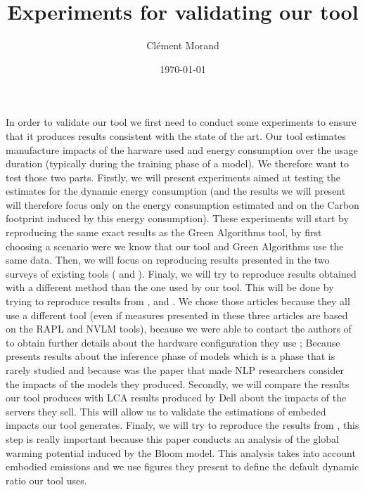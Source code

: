 \documentclass[11pt]{article}
\author{Clément Morand}
\date{\today}
\title{Experiments for validating our tool}
\begin{document}
\maketitle
\tableofcontents

In order to validate our tool we first need to conduct some
experiments to ensure that it produces results consistent with the
state of the art. Our tool estimates manufacture impacts of the
harware used and energy consumption over the usage duration (typically
during the training phase of a model). We therefore want to test those
two parts. 
Firstly, we will present experiments aimed at testing the
estimates for the dynamic energy consumption (and the results we will
present will therefore focus only on the energy consumption estimated
and on the Carbon footprint induced by this energy consumption). These experiments will
start by reproducing the same exact results as the
Green Algorithms tool, by first choosing a scenario were we know that
our tool and Green Algorithms use the same data. Then, we will focus
on reproducing results presented in the two surveys of existing tools
(\cite{Bannours2021evaluating} and
\cite{Jay2023experimental}). Finaly, we will try to reproduce results
obtained with a different method than the one used by our tool. This
will be done by trying to reproduce results from
\cite{Dinarelli2022toward}, \cite{Cattan2022benchmarking} and
\cite{Strubell2019energy}. We chose those articles because they all
use a different tool (even if measures presented in these three
articles are based on the \gls{RAPL} and \gls{NVLM} tools), because we
were able to contact the authors of
\cite{Dinarelli2022toward,Cattan2022benchmarking} to obtain further
details about the hardware configuration they use ; Because
\cite{Cattan2022benchmarking} presents results about the inference
phase of models which is a phase that is rarely studied and because
\cite{Strubell2019energy} was the paper that made NLP researchers
consider the impacts of the models they produced.
Secondly, we will compare the results our tool produces with \gls{LCA}
results produced by Dell about the impacts of the servers they
sell. This will allow us to validate the estimations of embeded
impacts our tool generates.
Finaly, we will try to reproduce the results from
\cite{Luccionni2022estimating}, this step is really important because
this paper conducts an analysis of the global warming potential
induced by the Bloom model. This analysis takes into account embodied
emissions and we use figures they present to define the default
dynamic ratio our tool uses.
\end{document}
